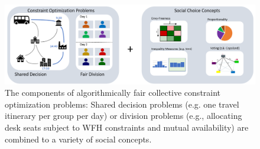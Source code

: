 \documentclass[german, a4paper, 11pt, oneside]{scrbook}
\begin{document}
\begin{figure}[h]
    \centering
    \includegraphics[width=\textwidth]{concepts}
    \caption{The components of algorithmically fair collective constraint optimization problems: Shared decision problems (e.g. one travel itinerary per group per day) or division problems (e.g., allocating desk seats subject to WFH constraints and mutual availability) are combined to a variety of social concepts.}
    \label{fig:overview}
\end{figure}
\end{document}
